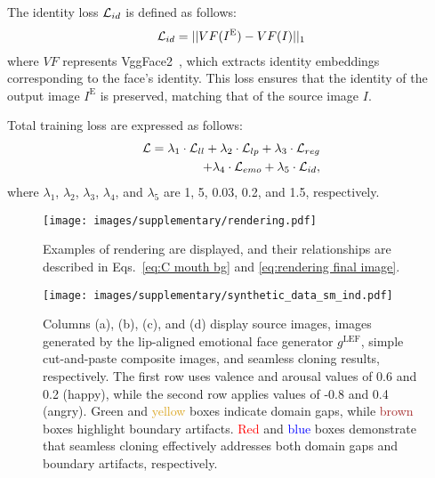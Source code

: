 The identity loss $\mathcal{L}_{id}$ is defined as follows:
\begin{eqnarray}
    \mathcal{L}_{id} = ||VF(I^\text{E})-VF(I)||_1
\end{eqnarray}
where $VF$ represents VggFace2~\cite{cao2018vggface2}, which extracts identity embeddings corresponding to the face's identity. This loss ensures that the identity of the output image $I^\text{E}$ is preserved, matching that of the source image $I$.

Total training loss are expressed as follows:
\begin{eqnarray}
    \mathcal{L} = \lambda_1 \cdot \mathcal{L}_{ll} + \lambda_2 \cdot \mathcal{L}_{lp} + \lambda_3 \cdot \mathcal{L}_{reg} \nonumber \\ 
    + \lambda_4 \cdot \mathcal{L}_{emo} + \lambda_5 \cdot \mathcal{L}_{id},
\end{eqnarray}
where $\lambda_1$, $\lambda_2$, $\lambda_3$, $\lambda_4$, and $\lambda_5$ are 1, 5, 0.03, 0.2, and 1.5, respectively.

\begin{figure}
    \centering
    \texttt{[image: images/supplementary/rendering.pdf]}
    \caption{Examples of rendering are displayed, and their relationships are described in Eqs.~\ref{eq:C mouth bg} and \ref{eq:rendering final image}.}
    \label{fig:rendering examples}
\end{figure}

\begin{figure*}
    \centering
    \texttt{[image: images/supplementary/synthetic\_data\_sm\_ind.pdf]}
    \caption{Columns (a), (b), (c), and (d) display source images, images generated by the lip-aligned emotional face generator $g^\text{LEF}$, simple cut-and-paste composite images, and seamless cloning results, respectively. The first row uses valence and arousal values of 0.6 and 0.2 (happy), while the second row applies values of -0.8 and 0.4 (angry). \textcolor{OliveGreen}{Green} and \textcolor{Goldenrod}{yellow} boxes indicate domain gaps, while \textcolor{brown}{brown} boxes highlight boundary artifacts. \textcolor{red}{Red} and \textcolor{blue}{blue} boxes demonstrate that seamless cloning effectively addresses both domain gaps and boundary artifacts, respectively.}
    \label{fig:synthetic data}
\end{figure*}


